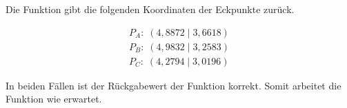 Die Funktion gibt die folgenden Koordinaten der Eckpunkte zurück.

\begin{equation*}
\label{eq:unit_test_positionsbestimmung_2}
\begin{split}
P_{A}: \; (4,8872 \;|\; 3,6618)\\
P_{B}: \; (4,9832 \;|\; 3,2583)\\
P_{C}: \; (4,2794 \;|\; 3,0196)
\end{split}
\end{equation*}

In beiden Fällen ist der Rückgabewert der Funktion korrekt. Somit arbeitet die Funktion wie erwartet.

